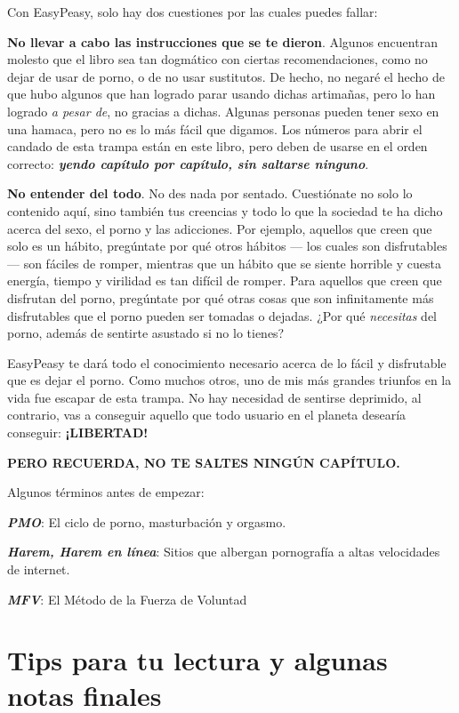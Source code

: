 \documentclass[
  spanish,
  openany]{book}
\begin{document}
Con EasyPeasy, solo hay dos cuestiones por las cuales puedes fallar:

\textbf{No llevar a cabo las instrucciones que se te dieron}. Algunos encuentran molesto que el libro sea tan dogmático con ciertas recomendaciones, como no dejar de usar de porno, o de no usar sustitutos. De hecho, no negaré el hecho de que hubo algunos que han logrado parar usando dichas artimañas, pero lo han logrado \emph{a pesar de}, no gracias a dichas. Algunas personas pueden tener sexo en una hamaca, pero no es lo más fácil que digamos. Los números para abrir el candado de esta trampa están en este libro, pero deben de usarse en el orden correcto: \emph{\textbf{yendo capítulo por capítulo, sin saltarse ninguno}}.

\textbf{No entender del todo}. No des nada por sentado. Cuestiónate no solo lo contenido aquí, sino también tus creencias y todo lo que la sociedad te ha dicho acerca del sexo, el porno y las adicciones. Por ejemplo, aquellos que creen que solo es un hábito, pregúntate por qué otros hábitos --- los cuales son disfrutables --- son fáciles de romper, mientras que un hábito que se siente horrible y cuesta energía, tiempo y virilidad es tan difícil de romper. Para aquellos que creen que disfrutan del porno, pregúntate por qué otras cosas que son infinitamente más disfrutables que el porno pueden ser tomadas o dejadas. ¿Por qué \emph{necesitas} del porno, además de sentirte asustado si no lo tienes?

EasyPeasy te dará todo el conocimiento necesario acerca de lo fácil y disfrutable que es dejar el porno. Como muchos otros, uno de mis más grandes triunfos en la vida fue escapar de esta trampa. No hay necesidad de sentirse deprimido, al contrario, vas a conseguir aquello que todo usuario en el planeta desearía conseguir: \textbf{¡LIBERTAD!}

\textbf{PERO RECUERDA, NO TE SALTES NINGÚN CAPÍTULO.}

Algunos términos antes de empezar:

\emph{\textbf{PMO}}: El ciclo de porno, masturbación y orgasmo.

\emph{\textbf{Harem, Harem en línea}}: Sitios que albergan pornografía a altas velocidades de internet.

\emph{\textbf{MFV}}: El Método de la Fuerza de Voluntad

\hypertarget{tips-para-tu-lectura-y-algunas-notas-finales}{%
\section{Tips para tu lectura y algunas notas finales}\label{tips-para-tu-lectura-y-algunas-notas-finales}}
\end{document}
